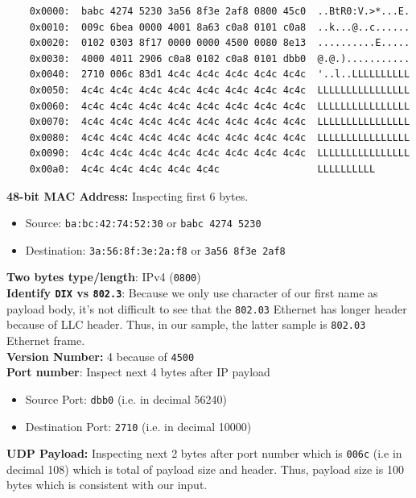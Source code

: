 \documentclass[12pt]{article}
\newenvironment{problem}[2][Problem]{\begin{trivlist}
\item[\hskip \labelsep {\bfseries #1}\hskip \labelsep {\bfseries #2.}]}{\end{trivlist}}
\begin{document}
\begin{problem}{3}
\begin{verbatim}
	0x0000:  babc 4274 5230 3a56 8f3e 2af8 0800 45c0  ..BtR0:V.>*...E.
	0x0010:  009c 6bea 0000 4001 8a63 c0a8 0101 c0a8  ..k...@..c......
	0x0020:  0102 0303 8f17 0000 0000 4500 0080 8e13  ..........E.....
	0x0030:  4000 4011 2906 c0a8 0102 c0a8 0101 dbb0  @.@.)...........
	0x0040:  2710 006c 83d1 4c4c 4c4c 4c4c 4c4c 4c4c  '..l..LLLLLLLLLL
	0x0050:  4c4c 4c4c 4c4c 4c4c 4c4c 4c4c 4c4c 4c4c  LLLLLLLLLLLLLLLL
	0x0060:  4c4c 4c4c 4c4c 4c4c 4c4c 4c4c 4c4c 4c4c  LLLLLLLLLLLLLLLL
	0x0070:  4c4c 4c4c 4c4c 4c4c 4c4c 4c4c 4c4c 4c4c  LLLLLLLLLLLLLLLL
	0x0080:  4c4c 4c4c 4c4c 4c4c 4c4c 4c4c 4c4c 4c4c  LLLLLLLLLLLLLLLL
	0x0090:  4c4c 4c4c 4c4c 4c4c 4c4c 4c4c 4c4c 4c4c  LLLLLLLLLLLLLLLL
	0x00a0:  4c4c 4c4c 4c4c 4c4c 4c4c                 LLLLLLLLLL
\end{verbatim}
\textbf{48-bit MAC Address:} Inspecting first 6 bytes.
\begin{itemize}
	\item Source: \texttt{ba:bc:42:74:52:30} or \texttt{babc 4274 5230}
	\item Destination: \texttt{3a:56:8f:3e:2a:f8} or \texttt{3a56 8f3e 2af8}
\end{itemize}
\textbf{Two bytes type/length}: IPv4 (\texttt{0800})\\
\textbf{Identify \texttt{DIX} vs \texttt{802.3}}: Because we only use character of our first name as payload body, it's not difficult to see that the \texttt{802.03} Ethernet has longer header  because of LLC header. Thus, in our sample, the latter sample is \texttt{802.03} Ethernet frame. \\
\textbf{Version Number:} 4 because of \texttt{4500} \\
\textbf{Port number}: Inspect next 4 bytes after IP payload
\begin{itemize}
	\item Source Port: \texttt{dbb0} (i.e. in decimal 56240)
	\item Destination Port: \texttt{2710} (i.e. in decimal 10000)
\end{itemize} 
\textbf{UDP Payload:} Inspecting next 2 bytes after port number which is \texttt{006c} (i.e in decimal 108) which is total of payload size and header. Thus, payload size is 100 bytes which is consistent with our input. 
\end{problem}
\end{document}
